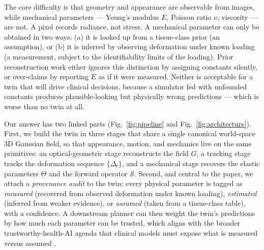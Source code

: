 \documentclass[review]{elsarticle}
\begin{document}
The core difficulty is that geometry and appearance are observable from
images, while mechanical parameters --- Young's modulus $E$, Poisson ratio
$\nu$, viscosity --- are not. A pixel records radiance, not stress. A
mechanical parameter can only be obtained in two ways: (a) it is looked up
from a tissue-class prior (an assumption), or (b) it is inferred by
observing deformation under known loading (a measurement, subject to the
identifiability limits of the loading). Prior reconstruction work either
ignores this distinction by assigning constants silently, or over-claims by
reporting $E$ as if it were measured. Neither is acceptable for a twin that
will drive clinical decisions, because a simulator fed with unfounded
constants produces plausible-looking but physically wrong predictions ---
which is worse than no twin at all.

Our answer has two linked parts (Fig.~\ref{fig:pipeline} and
Fig.~\ref{fig:architecture}). First, we build the twin in three stages that
share a single canonical world-space 3D Gaussian field, so that appearance,
motion, and mechanics live on the same primitives: an optical-geometric
stage reconstructs the field $G$, a tracking stage tracks the deformation
sequence $\{\Delta_t\}$, and a mechanical stage recovers the elastic
parameters $\Theta$ and the forward operator $\mathcal{S}$. Second, and
central to the paper, we attach a \emph{provenance audit} to the twin:
every physical parameter is tagged as \emph{measured} (recovered from
observed deformation under known loading), \emph{estimated} (inferred from
weaker evidence), or \emph{assumed} (taken from a tissue-class table), with
a confidence. A downstream planner can then weight the twin's predictions
by how much each parameter can be trusted, which aligns with the broader
trustworthy-health-AI agenda that clinical models must expose what is
measured versus assumed \citep{topol2019,landig2025}.
\end{document}
